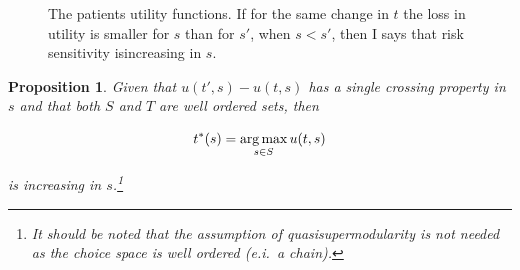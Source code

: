 \documentclass[10pt,a4paper]{article} %
\newtheorem{prop}[thm]{Proposition}
\theoremstyle{definition}
\theoremstyle{remark}
\begin{document}
\begin{figure}

\caption{\label{fig:The-patients-utility}The patients utility functions. If for the same change in $t$ the loss in utility is smaller for $s$ than for $s'$, when $s<s'$, then I says that risk sensitivity isincreasing in $s$.}
\end{figure}

\begin{prop}
Given that $u(t',s)-u(t,s)$ has a single crossing property in $s$ and that both $S$ and $T$ are well ordered sets, then

\[
t^{*}(s)=\argmax_{s\in S}u(t,s)
\]

is increasing in $s$.\footnote{It should be noted that the assumption of quasisupermodularity is not needed as the choice space is well ordered (e.i.\ a chain). %
}
\end{prop}
\end{document}
